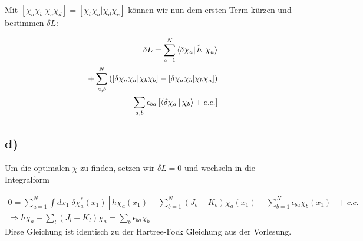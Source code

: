 Mit $\left[\chi_a \chi_b | \chi_c \chi_d \right] = \left[\chi_b \chi_a | \chi_d \chi_c \right]$ k\"onnen wir nun dem ersten Term k\"urzen und bestimmen $\delta L$:

\begin{align}
\delta L = \sum_{a=1}^N \Bra{\delta \chi_a} \hat{h} \Ket{\chi_a} \\
+ \sum_{a,b}^N \left( \left[\delta \chi_a \chi_a | \chi_b \chi_b \right] - \left[\delta \chi_a \chi_b | \chi_b \chi_a \right] \right) \\
- \sum_{a,b} \epsilon_{ba} \left[ \Braket{\delta \chi_a | \chi_b} + c.c. \right]
\end{align}

\subsection{d)}
Um die optimalen $\chi$ zu finden, setzen wir $\delta L = 0$ und wechseln in die Integralform

\begin{align}
0 = \sum_{a=1}^N \int dx_1 \; \delta \chi_a^* \left( x_1 \right) \left[ h \chi_a \left( x_1 \right) + \sum_{b=1}^N \left( J_b - K_b \right) \chi_a \left( x_1 \right) - \sum_{b=1}^N \epsilon_{ba} \chi_b \left( x_1 \right) \right] + c.c. \\
\Rightarrow h \chi_a + \sum_l \left( J_l - K_l \right) \chi_a = \sum_b \epsilon_{ba} \chi_b
\end{align}
Diese Gleichung ist identisch zu der Hartree-Fock Gleichung aus der Vorlesung.
